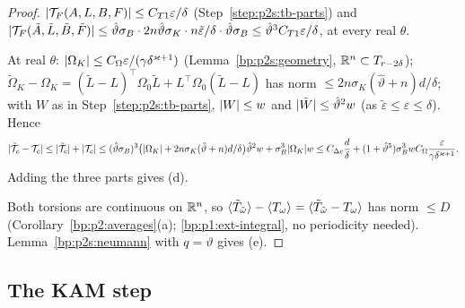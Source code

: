 \begin{proof}
\label{step:p2s:pt-f}
$\lvert \mathcal T_F(A,L,B,F)\rvert\le C_{T1}\varepsilon/\delta$ (Step~\ref{step:p2s:tb-parts}) and
$\lvert \mathcal T_F(\tilde A,\tilde L,\tilde B,\tilde F)\rvert\le\hat\vartheta\sigma_B\cdot2n\hat\vartheta\sigma_K\cdot n\tilde\varepsilon/\delta\cdot\hat\vartheta\sigma_B
\le\hat\vartheta^3C_{T1}\varepsilon/\delta$, at every real $\theta$.

\label{step:p2s:pt-c}
At real $\theta$: $\lvert \Omega_K\rvert\le C_\Omega\varepsilon/(\gamma\delta^{\varkappa+1})$ (Lemma~\ref{bp:p2s:geometry}, $\mathbb{R}^n\subset T_{r-2\delta}$);
$\tilde\Omega_K-\Omega_K=(\tilde L-L)^\top\Omega_0\tilde L+L^\top\Omega_0(\tilde L-L)$ has norm $\le2n\sigma_K(\hat\vartheta+n)d/\delta$; with
$W$ as in Step~\ref{step:p2s:tb-parts}, $\lvert W\rvert\le w$ and $\lvert \tilde W\rvert\le\hat\vartheta^2w$ (as $\tilde\varepsilon\le\varepsilon\le\delta$). Hence
\[
\lvert \tilde{\mathcal T}_c-\mathcal T_c\rvert\le\lvert \tilde{\mathcal T}_c\rvert+\lvert \mathcal T_c\rvert\le(\hat\vartheta\sigma_B)^3\bigl(\lvert \Omega_K\rvert+2n\sigma_K(\hat\vartheta+n)d/\delta\bigr)
\hat\vartheta^2w+\sigma_B^3\lvert \Omega_K\rvert w\le C_{\Delta c}\frac d\delta+(1+\hat\vartheta^5)\sigma_B^3wC_\Omega\frac\varepsilon{\gamma\delta^{\varkappa+1}}.
\]
Adding the three parts gives (d).

\label{step:p2s:pt-avg}
Both torsions are continuous on $\mathbb{R}^n$, so $\langle \tilde T_{\tilde\omega}\rangle-\langle T_\omega\rangle=\langle \tilde T_{\tilde\omega}-T_\omega\rangle$ has norm $\le D$
(Corollary~\ref{bp:p2:averages}(a); \ref{bp:p1:ext-integral}, no periodicity needed). Lemma~\ref{bp:p2s:neumann} with $q=\vartheta$ gives (e).
\end{proof}

\subsection{The KAM step}\label{bp:p2s:sec-step}

